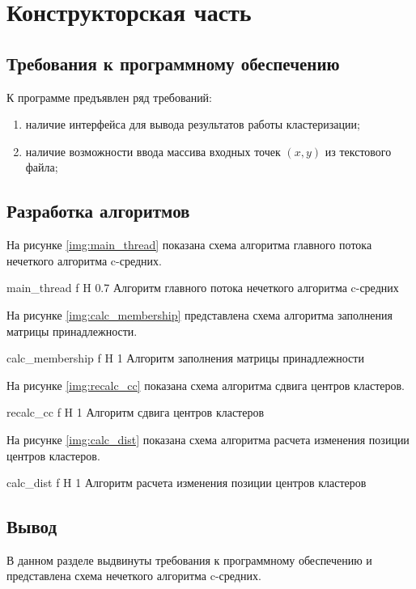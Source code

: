 \chapter{Конструкторская часть}

\section{Требования к программному обеспечению}

К программе предъявлен ряд требований:
\begin{enumerate}
	\item наличие интерфейса для вывода результатов работы кластеризации;
	\item наличие возможности ввода массива входных точек $(x, y)$ из текстового файла;
\end{enumerate}

\section{Разработка алгоритмов}

На рисунке \ref{img:main_thread} показана схема алгоритма главного потока нечеткого алгоритма c-средних.

	{main_thread}
	{f}
	{H}
	{0.7\textwidth}
	{Алгоритм главного потока нечеткого алгоритма c-средних}

На рисунке \ref{img:calc_membership} представлена схема алгоритма заполнения матрицы принадлежности.

	{calc_membership}
	{f}
	{H}
	{1\textwidth}
	{Алгоритм заполнения матрицы принадлежности}

На рисунке \ref{img:recalc_cc} показана схема алгоритма сдвига центров кластеров.

	{recalc_cc}
	{f}
	{H}
	{1\textwidth}
	{Алгоритм сдвига центров кластеров}

На рисунке \ref{img:calc_dist} показана схема алгоритма расчета изменения позиции центров кластеров.
	
	{calc_dist}
	{f}
	{H}
	{1\textwidth}
	{Алгоритм расчета изменения позиции центров кластеров}

\section*{Вывод}

В данном разделе выдвинуты требования к программному обеспечению и представлена схема нечеткого алгоритма c-средних.